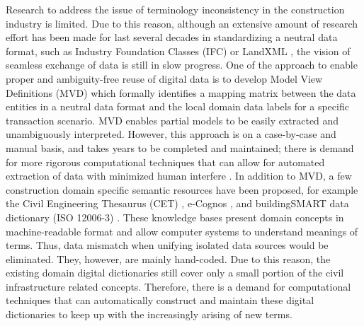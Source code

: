 \documentclass[Journal, InsideFigs, DoubleSpace]{ascelike} %
\begin{document}
\par
Research to address the issue of terminology inconsistency in the construction industry is limited. Due to this reason, although an extensive amount of research effort has been made for last several decades in standardizing a neutral data format, such as Industry Foundation Classes (IFC) \cite{buildingsmartIFC} or LandXML \cite{landxml15}, the vision of seamless exchange of data is still in slow progress. One of the approach to enable proper and ambiguity-free reuse of digital data is to develop Model View Definitions (MVD) \cite{buildingSmart} which formally identifies a mapping matrix between the data entities in a neutral data format and the local domain data labels for a specific transaction scenario. MVD enables partial models to be easily extracted and unambiguously interpreted. However, this approach is on a case-by-case and manual basis, and takes years to be completed and maintained; there is demand for more rigorous computational techniques that can allow for automated extraction of data with minimized human interfere \cite{venugopal12,eastman12}. In addition to MVD, a few construction domain specific semantic resources have been proposed, for example the Civil Engineering Thesaurus (CET) \cite{abuzir02}, e-Cognos \cite{wetherill02}, and buildingSMART data dictionary (ISO 12006-3) \cite{buildingsmartData}. These knowledge bases present domain concepts in machine-readable format and allow computer systems to understand meanings of terms. Thus, data mismatch when unifying isolated data sources would be eliminated. They, however, are mainly hand-coded. Due to this reason, the existing domain digital dictionaries still cover only a small portion of the civil infrastructure related concepts. Therefore, there is a demand for computational techniques that can automatically construct and maintain these digital dictionaries to keep up with the increasingly arising of new terms. 
\par
\end{document}
